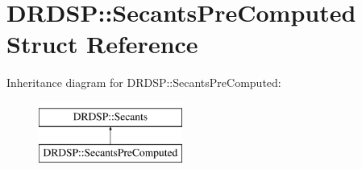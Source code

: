 \hypertarget{struct_d_r_d_s_p_1_1_secants_pre_computed}{\section{D\-R\-D\-S\-P\-:\-:Secants\-Pre\-Computed Struct Reference}
\label{struct_d_r_d_s_p_1_1_secants_pre_computed}
}
Inheritance diagram for D\-R\-D\-S\-P\-:\-:Secants\-Pre\-Computed\-:\begin{figure}[H]
\begin{center}
\leavevmode
\includegraphics[height=2.000000cm]{struct_d_r_d_s_p_1_1_secants_pre_computed}
\end{center}
\end{figure}
